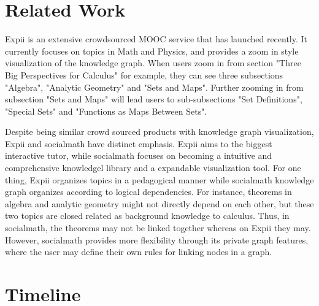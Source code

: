 \documentclass{acm_proc_article-sp}
\begin{document}
\section{Related Work}
Expii \cite{expii} is an extensive crowdsourced MOOC service that has  launched recently. It currently focuses on topics in Math and Physics, and provides a zoom in style visualization of the knowledge graph. When users zoom in from section "Three Big Perspectives for Calculus" for example, they can see three subsections "Algebra", "Analytic Geometry" and "Sets and Maps". Further zooming in from subsection "Sets and Maps" will lead users to sub-subsections "Set Definitions", "Special Sets" and "Functions as Maps Between Sets".

Despite being similar crowd sourced products with knowledge graph visualization, Expii and socialmath have distinct emphasis. Expii aims to the biggest interactive tutor, while socialmath focuses on becoming a intuitive and comprehensive knowledgel library and a expandable visualization tool. For one thing, Expii organizes topics in a pedagogical manner while socialmath knowledge graph organizes according to logical dependencies. For instance, theorems in algebra and analytic geometry might not directly depend on each other, but these two topics are closed related as background knowledge to calculus. Thus, in socialmath, the theorems may not be linked together whereas on Expii they may. However, socialmath provides more flexibility through its private graph features, where the user may define their own rules for linking nodes in a graph. 

\section{Timeline}
\end{document}
